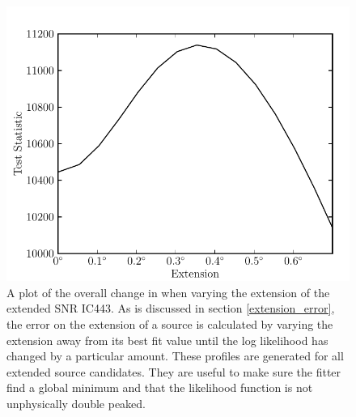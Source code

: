 \documentclass[12pt,preprint]{aastex}
\newcommand{\ts}{\text{TS}\xspace}
\begin{document}
\clearpage
\begin{figure}
  \begin{center}
    \includegraphics{ic443_plots/profile_ic443.pdf}
    \caption{
    A plot of the overall change in \ts when varying the
    extension of the extended SNR IC443.  As is discussed in section
    \ref{extension_error}, the error on the extension of a source is
    calculated by varying the extension away from its best fit value until
    the log likelihood has changed by a particular amount.  These profiles are
    generated for all extended source candidates. They are useful
    to make sure the fitter find a global minimum and that
    the likelihood function is not unphysically double peaked.
    }
    \label{extension_profile}
  \end{center}
\end{figure}
\end{document}
